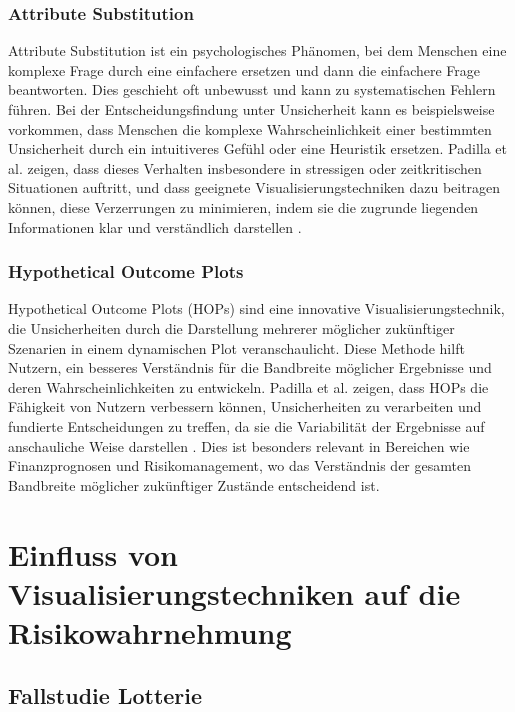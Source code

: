\subsubsection{Attribute Substitution}
Attribute Substitution ist ein psychologisches Phänomen, bei dem Menschen eine komplexe Frage durch eine einfachere ersetzen und 
dann die einfachere Frage beantworten. Dies geschieht oft unbewusst und kann zu systematischen Fehlern führen. Bei der 
Entscheidungsfindung unter Unsicherheit kann es beispielsweise vorkommen, dass Menschen die komplexe Wahrscheinlichkeit 
einer bestimmten Unsicherheit durch ein intuitiveres Gefühl oder eine Heuristik ersetzen. Padilla et al. zeigen, dass 
dieses Verhalten insbesondere in stressigen oder zeitkritischen Situationen auftritt, und dass geeignete Visualisierungstechniken 
dazu beitragen können, diese Verzerrungen zu minimieren, indem sie die zugrunde liegenden Informationen klar und verständlich 
darstellen \cite{Padilla2021}.

\subsubsection{Hypothetical Outcome Plots}
Hypothetical Outcome Plots (HOPs) sind eine innovative Visualisierungstechnik, die Unsicherheiten durch die Darstellung 
mehrerer möglicher zukünftiger Szenarien in einem dynamischen Plot veranschaulicht. Diese Methode hilft Nutzern, 
ein besseres Verständnis für die Bandbreite möglicher Ergebnisse und deren Wahrscheinlichkeiten zu entwickeln. Padilla et al. 
zeigen, dass HOPs die Fähigkeit von Nutzern verbessern können, Unsicherheiten zu verarbeiten und fundierte Entscheidungen zu 
treffen, da sie die Variabilität der Ergebnisse auf anschauliche Weise darstellen \cite{Padilla2021}. Dies ist besonders 
relevant in Bereichen wie Finanzprognosen und Risikomanagement, wo das Verständnis der gesamten Bandbreite möglicher zukünftiger 
Zustände entscheidend ist.

\cite{Joslyn2021}

\section{Einfluss von Visualisierungstechniken auf die Risikowahrnehmung}
\subsection{Fallstudie Lotterie}
\cite{Larcher2020}
\cite{Pang1997}
\cite{Kerr2023}
\cite{Brodlie2012ARO}
\cite{Haber1990}
